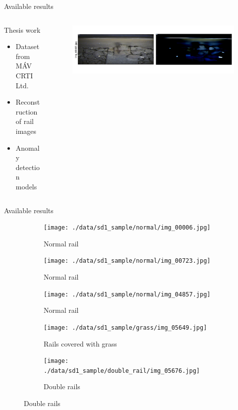 \documentclass[aspectratio=169]{beamer}
\begin{document}
\begin{frame}{Available results}
    \begin{columns}[T]
        \begin{column}{0.45\textwidth}
            Thesis work
            \begin{itemize}
                \item Dataset from MÁV CRTI Ltd.
                \item Reconstruction of rail images
                \item Anomaly detection models
            \end{itemize}
        \end{column}
        \pause
        \begin{column}{0.45\textwidth}
            \begin{figure}
                \centering
                \includegraphics[width=\columnwidth,trim={0 1cm 0 1cm},clip]{./results/vgg19_vgg19/20230510_172958_predict_0.png}
            \end{figure}
        \end{column}
    \end{columns}
\end{frame}

\begin{frame}{Available results}
    \begin{figure}
        \centering
        \begin{subfigure}{0.3\textwidth}
            \centering
            \texttt{[image: ./data/sd1\_sample/normal/img\_00006.jpg]}
            \caption*{Normal rail}
        \end{subfigure}
        \begin{subfigure}{0.3\textwidth}
            \centering
            \texttt{[image: ./data/sd1\_sample/normal/img\_00723.jpg]}
            \caption*{Normal rail}
        \end{subfigure}
        \begin{subfigure}{0.3\textwidth}
            \centering
            \texttt{[image: ./data/sd1\_sample/normal/img\_04857.jpg]}
            \caption*{Normal rail}
        \end{subfigure}
        \begin{subfigure}{0.3\textwidth}
            \centering
            \texttt{[image: ./data/sd1\_sample/grass/img\_05649.jpg]}
            \caption*{Rails covered with grass}
        \end{subfigure}
        \begin{subfigure}{0.3\textwidth}
            \centering
            \texttt{[image: ./data/sd1\_sample/double\_rail/img\_05676.jpg]}
            \caption*{Double rails}
        \end{subfigure}
    \end{figure}
\end{frame}
\end{document}
